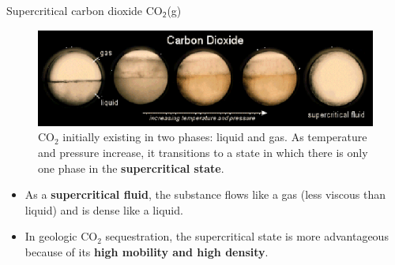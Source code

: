%
%
\begin{frame}{Supercritical carbon dioxide CO$_{\mathsf{2}}$(g)}
\vskip 5pt
\begin{figure}
\centering
\includegraphics[height=0.45\textheight]{figures/activity-models/subcritical-to-supercritical-co2}
\caption{CO$_{2}$ initially existing in two phases: liquid and gas. As temperature
and pressure increase, it transitions to a state in which there is
only one phase in the \textbf{supercritical state}.}
\end{figure}

\begin{itemize}
\item As a \alert{\textbf{supercritical fluid}}, the substance flows like a gas (less viscous
than liquid) and is dense like a liquid. 
\item In geologic CO$_{2}$ sequestration, the supercritical state is more
advantageous because of its \textbf{high mobility and high density}.
\end{itemize}

\end{frame}
%
%
